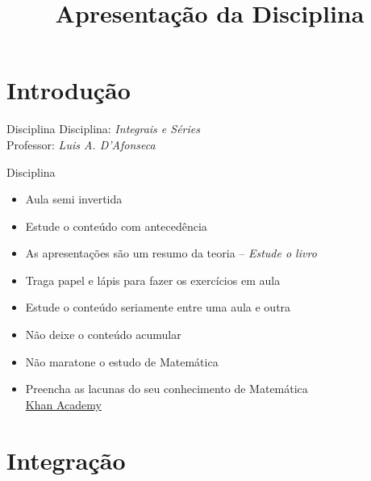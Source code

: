 \documentclass[fleqn,utf8,aspectratio=169,12pt]{beamer}
\title{Apresentação da Disciplina}
\begin{document}
\addtitle

\section{Introdução}

\begin{frame}{Disciplina}
   Disciplina: \emph{\large Integrais e Séries}\\[7mm]
   Professor: \emph{\large Luis A. D'Afonseca}
\end{frame}

\begin{frame}{Disciplina}
\begin{itemize}[<+->]
  \item Aula semi invertida
  \item Estude o conteúdo com antecedência
  \item As apresentações são um resumo da teoria -- \emph{Estude o livro}
  \item Traga papel e lápis para fazer os exercícios em aula
  \item Estude o conteúdo seriamente entre uma aula e outra
  \item Não deixe o conteúdo acumular
  \item Não maratone o estudo de Matemática
  \item Preencha as lacunas do seu conhecimento de Matemática \\
        \href{https://pt.khanacademy.org}{Khan Academy}
\end{itemize}
\end{frame}

\section{Integração}
\end{document}
